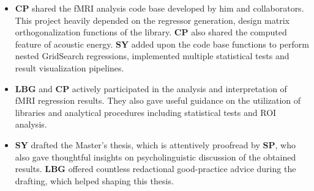 \begin{declarationcontribution}
\begin{itemize}
    \item \textbf{CP} shared the fMRI analysis code base developed by him and collaborators. This project heavily depended on the regressor generation, design matrix orthogonalization functions of the library. \textbf{CP} also shared the computed feature of acoustic energy. \textbf{SY} added upon the code base functions to perform nested GridSearch regressions, implemented multiple statistical tests and result visualization pipelines.
    \item \textbf{LBG} and \textbf{CP} actively participated in the analysis and interpretation of fMRI regression results. They also gave useful guidance on the utilization of  libraries and analytical procedures including statistical tests and ROI analysis.
    \item \textbf{SY} drafted the Master's thesis, which is attentively proofread by \textbf{SP}, who also gave thoughtful insights on psycholinguistic discussion of the obtained results. \textbf{LBG} offered countless redactional good-practice advice during the drafting, which helped shaping this thesis.
    \end{itemize}
     
\end{declarationcontribution}
